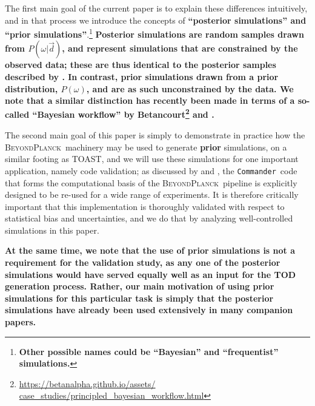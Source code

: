 \documentclass[twocolumn]{aa}%
\def\WMAP{\emph{WMAP}}
\def\commander{\texttt{Commander}}
\renewcommand{\d}[0]{\vec{d}}
\newcommand{\red}[0]{\color{red}}
\newcommand{\BP}{\textsc{BeyondPlanck}}
\begin{document}
The first main goal of the current paper is to explain these
differences intuitively, and in that process we introduce the concepts
of {\bf ``posterior simulations'' and ``prior
  simulations''}.\footnote{\bf Other possible names could be
  ``Bayesian'' and ``frequentist'' simulations.} {\bf Posterior
  simulations are random samples drawn from $P(\omega|\d)$, and
  represent simulations that are constrained by the observed data;
  these are thus identical to the posterior samples described by
  \citet{bp01}. In contrast, {\bf prior} simulations drawn from a
  prior distribution, $P(\omega)$, and are as such unconstrained by
  the data. We note that a similar distinction has recently been made in terms of a so-called ``Bayesian workflow'' by Betancourt\footnote{\url{https://betanalpha.github.io/assets/
case_studies/principled_bayesian_workflow.html}} and \citet{gelman:2020}.}

The second main goal of this paper is simply to demonstrate in
practice how the \BP\ machinery may be used to generate {\bf prior}
simulations, on a similar footing as TOAST, and we will use these
simulations for one important application, namely code validation; as
discussed by \citet{bp03} and \citet{bp05}, the \commander\ code that
forms the computational basis of the \BP\ pipeline is explicitly
designed to be re-used for a wide range of experiments. It is
therefore critically important that this implementation is thoroughly
validated with respect to statistical bias and uncertainties, and we
do that by analyzing well-controlled simulations in this paper.

{\bf At the same time, we note that the use of prior simulations is
  not a requirement for the validation study, as any one of the
  posterior simulations would have served equally well as an input for
  the TOD generation process. Rather, our main motivation of using
  prior simulations for this particular task is simply that the
  posterior simulations have already been used extensively in many
  companion papers.}

\end{document}
